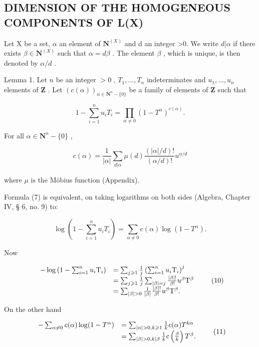 \subsection{DIMENSION OF THE HOMOGENEOUS COMPONENTS OF L(X)}

Let X be a set, \(\alpha\) an element of \(\mathbf{N}^{(X)}\) and d an integer >0. We write \(d|\alpha\) if there exists \(\beta\in\mathbf{N}^{(X)}\) such that \(\alpha=d\beta\) . The element \(\beta\) , which is unique, is then denoted by \(\alpha/d\) .

Lemma 1. Let \(n\) be an integer \(>0\) , \(T_1, \ldots, T_n\) indeterminates and \(u_1, \ldots, u_n\) elements of \(\mathbf{Z}\) . Let \((c(\alpha))_{\alpha \in \mathbf{N}^n - \{0\}}\) be a family of elements of \(\mathbf{Z}\) such that

\[
1 - \sum_ {i = 1} ^ {n} u _ {i} T _ {i} = \prod_ {\alpha \neq 0} (1 - T ^ {\alpha}) ^ {c (\alpha)}.\tag{7}
\]

For all \(\alpha \in \mathbf{N}^n - \{0\}\) ,

\[
c (\alpha) = \frac {1}{| \alpha |} \sum_ {d | \alpha} \mu (d) \frac {(| \alpha | / d) !}{(\alpha / d) !} u ^ {\alpha / d}\tag{8}
\]

where \(\mu\) is the Möbius function (Appendix).

Formula (7) is equivalent, on taking logarithms on both sides (Algebra, Chapter IV, § 6, no. 9) to:

\[
\log \left(1 - \sum_ {i = 1} ^ {n} u _ {i} T _ {i}\right) = \sum_ {\alpha \neq 0} c (\alpha) \log (1 - T ^ {\alpha}).\tag{9}
\]

Now

\[
\begin{array}{r l} - \log \left(1 - \sum_ {i = 1} ^ {n} u _ {i} \mathrm{T} _ {i}\right) & = \sum_ {j \geqslant 1} \frac {1}{j} \left(\sum_ {i = 1} ^ {n} u _ {i} \mathrm{T} _ {i}\right) ^ {j} \\ & = \sum_ {j \geqslant 1} \frac {1}{j} \sum_ {| \beta | = j} \frac {| \beta | !}{\beta !} u ^ {\beta} \mathrm{T} ^ {\beta} \\ & = \sum_ {| \beta | > 0} \frac {1}{| \beta |} \frac {| \beta | !}{\beta !} u ^ {\beta} \mathrm{T} ^ {\beta}. \end{array}\tag{10}
\]

On the other hand

\[
\begin{array}{r l} - \sum_ {\alpha \neq 0} c (\alpha) \log (1 - T ^ {\alpha}) & = \sum_ {| \alpha | > 0, k \geqslant 1} \frac {1}{k} c (\alpha) T ^ {k \alpha} \\ & = \sum_ {| \beta | > 0, k | \beta} \frac {1}{k} c \left(\frac {\beta}{k}\right) T ^ {\beta}. \end{array}\tag{11}
\]

